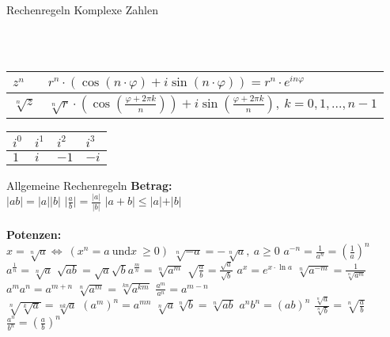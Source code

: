 \begin{Rechenregeln}{Rechenregeln Komplexe Zahlen}{}
\begin{tabular}{|l|l|l|}
        \hline
    \end{tabular}\\
    \begin{tabular}{|l|l|}
        \hline
        \(z^{n}\) & \(r^{n} \cdot (\cos(n\cdot \varphi)+ i \sin(n \cdot \varphi)) = r^{n} \cdot e^{in\varphi}\)\rule{0pt}{2.6ex}\\
        \hline
        \(\sqrt[n]{z}\) & \(\sqrt[n]{r}\cdot(\cos(\frac{\varphi + 2\pi k}{n})) + i\sin(\frac{\varphi + 2 \pi k }{n}), \ k = 0, 1, ..., n-1 \) \rule{0pt}{2.6ex}\\
        \hline
    \end{tabular}
    \begin{tabular}{|l|l|l|l|}
        \hline \(i^{0}\) & \(i^{1}\) & \(i^{2}\) & \(i^{3}\)\\
        \hline \(1\) & \(i\) & \(-1\) & \(-i\)\\
        \hline
    \end{tabular}
\end{Rechenregeln}

\begin{Rechenregeln}{Allgemeine Rechenregeln}{}
    \textbf{Betrag:} \\
    \(\vert ab \vert = \vert a \vert \vert b\vert \) \abstand 
    \(\vert \frac{a}{b} \vert = \frac{\vert a \vert}{ \vert b\vert} \) \abstand
    \(\vert a + b \vert \le \vert a \vert + \vert b \vert\) \\
    \\
    \textbf{Potenzen:} \\
    \(x = \sqrt[n]{a} 	\Leftrightarrow\ (x^{n}  = a \ \text{und} x \ \ge 0)\) \abstand
    \(\sqrt[n]{-a} = - \sqrt[n]{a}, \ a \ge 0\) \abstand
    \(a^{-n} = \frac{1}{a^{n}} = (\frac{1}{a})^{n}\) \abstand \(a^{\frac{1}{n}} = \sqrt[n]{a}\) \abstand \(\sqrt{ab} = \sqrt{a}\sqrt{b}\)\abstand \(a^{\frac{m}{n}} = \sqrt[n]{a^{m}}\) \abstand
    \( \sqrt{\frac{a}{b}} = \frac{\sqrt{a}}{\sqrt{b}} \) \abstand \( a^{x} = e^{x \cdot \ln a}\) \abstand 
    \(\sqrt[n]{a^{-m}} = \frac{1}{\sqrt[n]{a^{m}}}\)
    \(a^{m}a^{n} = a^{m+n} \) \abstand \(\sqrt[n]{a^{m}} = \sqrt[kn]{a^{km}}\) \abstand \(\frac{a^{m}}{a^{n}} = a^{m-n}\)
    \\ \( \sqrt[n]{\sqrt[k]{a}} = \sqrt[nk]{a}\) \abstand  \((a^{m})^{n} = a^{mn}\) \abstand \(\sqrt[n]{a}\sqrt[n]{b} = \sqrt[n]{ab}\) 
    \abstand \(a^{n}b^{n} = (ab)^{n}\) \abstand \(\frac{\sqrt[n]{a}}{\sqrt[n]{b}} = \sqrt[n]{\frac{a}{b}}\) 
    \abstand \(\frac{a^{n}}{b^{n}} = (\frac{a}{b})^{n}\) 
\end{Rechenregeln}

